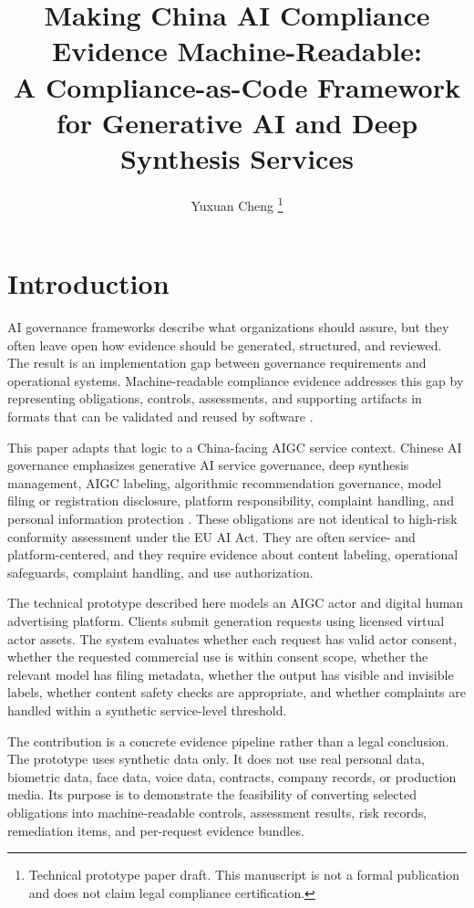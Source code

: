 \documentclass[10pt,journal]{IEEEtran}
\title{Making China AI Compliance Evidence Machine-Readable:\\
A Compliance-as-Code Framework for Generative AI and Deep Synthesis Services}
\author{Yuxuan Cheng%
\thanks{Technical prototype paper draft. This manuscript is not a formal publication and does not claim legal compliance certification.}}
\begin{document}
\maketitle
\IEEEdisplaynontitleabstractindextext
\IEEEpeerreviewmaketitle

\section{Introduction}

AI governance frameworks describe what organizations should assure, but they often leave open how evidence should be generated, structured, and reviewed. The result is an implementation gap between governance requirements and operational systems. Machine-readable compliance evidence addresses this gap by representing obligations, controls, assessments, and supporting artifacts in formats that can be validated and reused by software \cite{ugarte2026machineReadableAICompliance}.

This paper adapts that logic to a China-facing AIGC service context. Chinese AI governance emphasizes generative AI service governance, deep synthesis management, AIGC labeling, algorithmic recommendation governance, model filing or registration disclosure, platform responsibility, complaint handling, and personal information protection \cite{cac2023generativeai,cac2022deepsynthesis,cac2025labeling,gb45438,pipl2021}. These obligations are not identical to high-risk conformity assessment under the EU AI Act. They are often service- and platform-centered, and they require evidence about content labeling, operational safeguards, complaint handling, and use authorization.

The technical prototype described here models an AIGC actor and digital human advertising platform. Clients submit generation requests using licensed virtual actor assets. The system evaluates whether each request has valid actor consent, whether the requested commercial use is within consent scope, whether the relevant model has filing metadata, whether the output has visible and invisible labels, whether content safety checks are appropriate, and whether complaints are handled within a synthetic service-level threshold.

The contribution is a concrete evidence pipeline rather than a legal conclusion. The prototype uses synthetic data only. It does not use real personal data, biometric data, face data, voice data, contracts, company records, or production media. Its purpose is to demonstrate the feasibility of converting selected obligations into machine-readable controls, assessment results, risk records, remediation items, and per-request evidence bundles.
\end{document}

